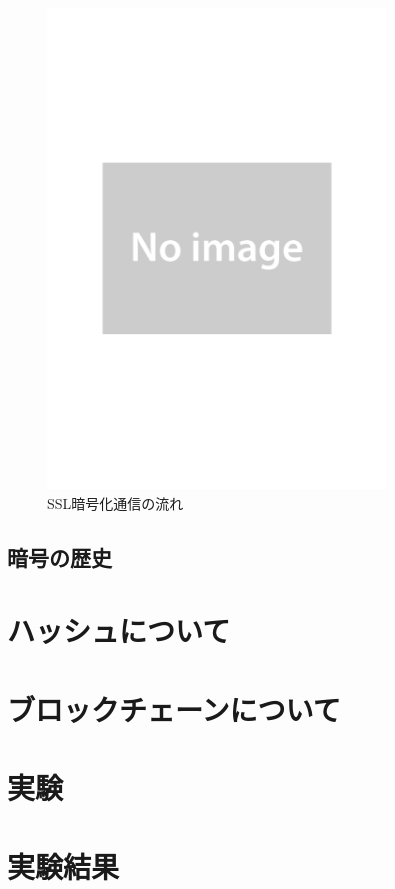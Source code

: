 \documentclass[a4j,12pt]{jsarticle}
\begin{document}
\begin{figure}[H]
\centering
\includegraphics[width=9cm]{noimage.pdf}
\caption{SSL暗号化通信の流れ}
\label{fig:no}
\end{figure} 



\subsection{暗号の歴史}







\section{ハッシュについて}

\section{ブロックチェーンについて}

\section{実験}


\section{実験結果}
\end{document}
